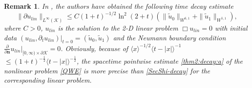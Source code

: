 \documentclass[11pt,twoside]{article}
\def\cK{\mathcal K}
\def\f{\frac}
\def\p{\partial}
\def\bn{\mathbf{n}}
\newcommand{\w}[1]{\langle {#1} \rangle}
\theoremstyle{plain}
\newtheorem{remark}{Remark}[section]
\theoremstyle{definition}
\numberwithin{equation}{section}
\begin{document}
\begin{remark}\label{YinA-3}
In \cite{Secchi-Shibata03}, the authors have obtained  the following time decay estimate
\begin{equation}\label{SecShi-decay}
\|\p u_{lin}\|_{L^\infty(\cK)}\le C(1+t)^{-1/2}\ln^2(2+t)(\|\tilde u_0\|_{W^{6,1}}+\|\tilde u_1\|_{W^{5,1}}),
\end{equation}
where $C>0$, $u_{lin}$ is the solution to the 2-D linear problem $\Box u_{lin}=0$ with
initial data $(u_{lin},\p_tu_{lin})|_{t=0}=(\tilde u_0,\tilde u_1)$ and the Neumann
boundary condition $\frac{\p}{\p\bn}u_{lin}|_{[0,\infty)\times\p\cK}=0$.
Obviously, because of $\w{x}^{-1/2}\w{t-|x|}^{-1}$ $\le (1+t)^{-\f12}\w{t-|x|}^{-\f12}$,
the spacetime pointwise estimate \eqref{thm2:decay:a} of the nonlinear problem \eqref{QWE}
is more precise than \eqref{SecShi-decay} for the corresponding linear problem.
\end{remark}
\end{document}
